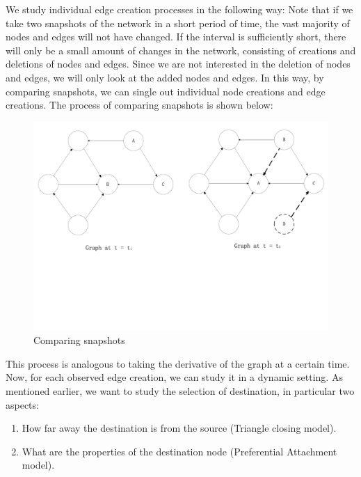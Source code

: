 \documentclass[10pt]{article}
\begin{document}
\begin{multicols}{2}
We study individual edge creation processes in the following way: Note that if we take two snapshots of the network in a short period of time, the vast majority of nodes and edges will not have changed. If the interval is sufficiently short, there will only be a small amount of changes in the network, consisting of creations and deletions of nodes and edges. Since we are not interested in the deletion of nodes and edges, we will only look at the added nodes and edges. In this way, by comparing snapshots, we can single out individual node creations and edge creations. The process of comparing snapshots is shown below:
\begin{figure}[H]
    \centering
        \includegraphics[scale = 0.25, trim = 0cm 8cm 0cm 0cm]{./graphs/dynamic.pdf}
    \caption{Comparing snapshots} \label{fig:compare}
\end{figure}


This process is analogous to taking the derivative of the graph at a certain time. Now, for each observed edge creation, we can study it in a dynamic setting. As mentioned earlier, we want to study the selection of destination, in particular two aspects:
\begin{enumerate}
\item How far away the destination is from the source (Triangle closing model).
\item What are the properties of the destination node (Preferential Attachment model).
\end{enumerate}


\end{multicols}
\end{document}

